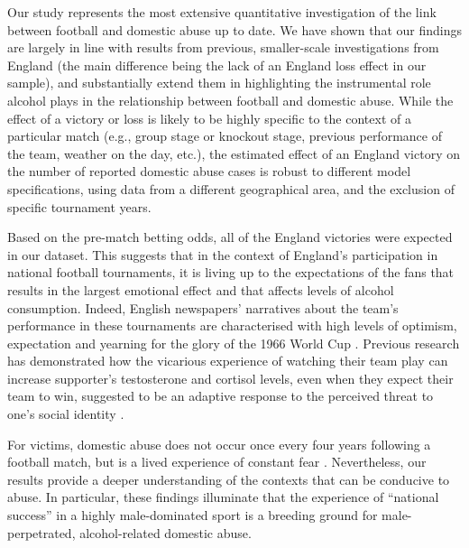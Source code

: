 \documentclass[12pt, a4paper]{article}
\begin{document}
 Our study represents the most extensive quantitative investigation of the link between football and domestic abuse up to date. We have shown that our findings are largely in line with results from previous, smaller-scale investigations from England (the main difference being the lack of an England loss effect in our sample), and substantially extend them in highlighting the instrumental role alcohol plays in the relationship between football and domestic abuse. While the effect of a victory or loss is likely to be highly specific to the context of a particular match (e.g., group stage or knockout stage, previous performance of the team, weather on the day, etc.), the estimated effect of an England victory on the number of reported domestic abuse cases is robust to different model specifications, using data from a different geographical area, and the exclusion of specific tournament years. 


Based on the pre-match betting odds, all of the England victories were expected in our dataset. This suggests that in the context of England's participation in national football tournaments, it is living up to the expectations of the fans that results in the largest emotional effect and that affects levels of alcohol consumption. Indeed, English newspapers' narratives about the team's performance in these tournaments are characterised with high levels of optimism, expectation and yearning for the glory of the 1966 World Cup \cite{Vincent2010}. Previous research has demonstrated how the vicarious experience of watching their team play can increase supporter's testosterone and cortisol levels, even when they expect their team to win, suggested to be an adaptive response to the perceived threat to one's social identity \cite{VanderMeij2012}. 








For victims, domestic abuse does not occur once every four years following a football match, but is a lived experience of constant fear \cite{Brooks-Hay2018}. Nevertheless, our results provide a deeper understanding of the contexts that can be conducive to abuse. In particular, these findings illuminate that the experience of ``national success'' in a highly male-dominated sport is a breeding ground for male-perpetrated, alcohol-related domestic abuse.
\end{document}

